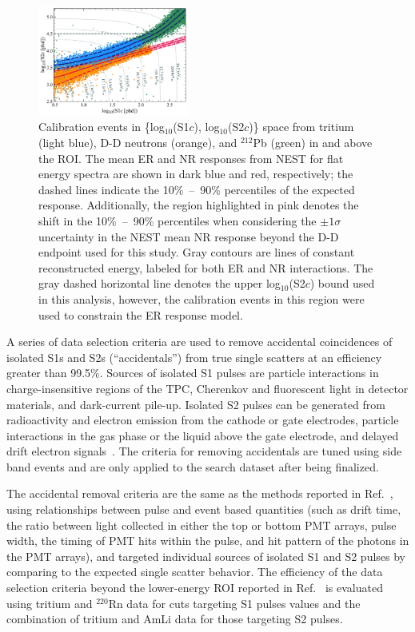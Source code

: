 \documentclass[reprint, showpacs,
preprintnumbers,
amsmath,amssymb,
aps, floatfix,
superscriptaddress,
prd, nofootinbib]{revtex4-1}
\begin{document}
\begin{figure}[ht]
    \centering
    \includegraphics[trim={8 5 5 5},clip, width=0.44\textwidth]{SR1WS_EFT_LogLog}
    \caption{Calibration events in \{log$_{10}$(S1$c$), log$_{10}$(S2$c$)\} space from tritium (light blue), D-D neutrons (orange), and ${}^{212}$Pb (green) in and above the ROI.
    The mean ER and NR responses from NEST for flat energy spectra are shown in dark blue and red, respectively; the dashed lines indicate the 10\%~--~90\% percentiles of the expected response.
    Additionally, the region highlighted in pink denotes the shift in the 10\%~--~90\% percentiles when considering the $\pm1\sigma$ uncertainty in the NEST mean NR response beyond the D-D endpoint used for this study.
    Gray contours are lines of constant reconstructed energy, labeled for both ER and NR interactions. 
    The gray dashed horizontal line denotes the upper log$_{10}$(S2$c$) bound used in this analysis, however, the calibration events in this region were used to constrain the ER response model. 
    }
    \label{fig:calibrations}
\end{figure}

\par
A series of data selection criteria are used to remove accidental coincidences of isolated S1s and S2s (``accidentals'') from true single scatters at an efficiency greater than 99.5\%. 
Sources of isolated S1 pulses are particle interactions in charge-insensitive regions of the TPC, Cherenkov and fluorescent light in detector materials, and dark-current pile-up. 
Isolated S2 pulses can be generated from radioactivity and electron emission from the cathode or gate electrodes, particle interactions in the gas phase or the liquid above the gate electrode, and delayed drift electron signals~\cite{LUX:2020vbj}.  
The criteria for removing accidentals are tuned using side band events and are only applied to the search dataset after being finalized. 

The accidental removal criteria are the same as the methods reported in Ref.~\cite{LZ:SR1WS_2022}, using relationships between pulse and event based quantities (such as drift time, the ratio between light collected in either the top or bottom PMT arrays, pulse width, the timing of PMT hits within the pulse, and hit pattern of the photons in the PMT arrays), and targeted individual sources of isolated S1 and S2 pulses by comparing to the expected single scatter behavior.
The efficiency of the data selection criteria beyond the lower-energy ROI reported in Ref.~\cite{LZ:SR1WS_2022} is evaluated using tritium and $^{220}$Rn data for cuts targeting S1 pulses values and the combination of tritium and AmLi data for those targeting S2 pulses. 
\end{document}

